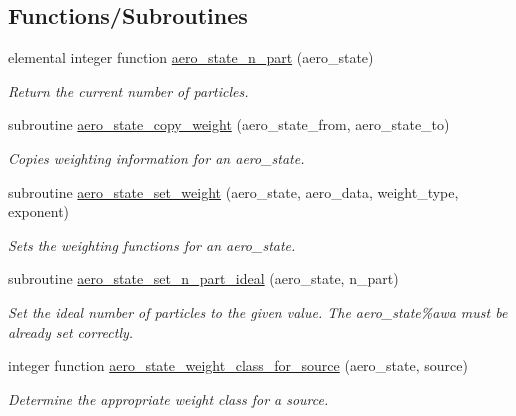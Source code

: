 \subsection*{Functions/\+Subroutines}
\begin{DoxyCompactItemize}
\item 
elemental integer function \mbox{\hyperlink{namespacepmc__aero__state_a94155bf7fa94e7c3ab722a5a1dacac98}{aero\+\_\+state\+\_\+n\+\_\+part}} (aero\+\_\+state)
\begin{DoxyCompactList}\small\item\em Return the current number of particles. \end{DoxyCompactList}\item 
subroutine \mbox{\hyperlink{namespacepmc__aero__state_ade0790e3c1fbf87ed303a8ab22de32e3}{aero\+\_\+state\+\_\+copy\+\_\+weight}} (aero\+\_\+state\+\_\+from, aero\+\_\+state\+\_\+to)
\begin{DoxyCompactList}\small\item\em Copies weighting information for an {\ttfamily aero\+\_\+state}. \end{DoxyCompactList}\item 
subroutine \mbox{\hyperlink{namespacepmc__aero__state_ae949175272a73f61c851a2ac4a58c712}{aero\+\_\+state\+\_\+set\+\_\+weight}} (aero\+\_\+state, aero\+\_\+data, weight\+\_\+type, exponent)
\begin{DoxyCompactList}\small\item\em Sets the weighting functions for an {\ttfamily aero\+\_\+state}. \end{DoxyCompactList}\item 
subroutine \mbox{\hyperlink{namespacepmc__aero__state_a82d688a836cb8ed88c46dd010247d3c1}{aero\+\_\+state\+\_\+set\+\_\+n\+\_\+part\+\_\+ideal}} (aero\+\_\+state, n\+\_\+part)
\begin{DoxyCompactList}\small\item\em Set the ideal number of particles to the given value. The {\ttfamily aero\+\_\+state\%awa} must be already set correctly. \end{DoxyCompactList}\item 
integer function \mbox{\hyperlink{namespacepmc__aero__state_a070d20781c622419c7823654680595b4}{aero\+\_\+state\+\_\+weight\+\_\+class\+\_\+for\+\_\+source}} (aero\+\_\+state, source)
\begin{DoxyCompactList}\small\item\em Determine the appropriate weight class for a source. \end{DoxyCompactList}\item 

\end{DoxyCompactItemize}
